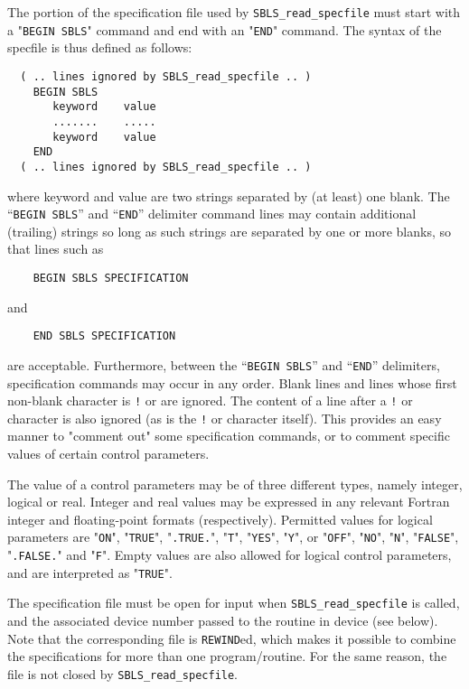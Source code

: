 \documentclass{galahad}
\newcommand{\packagename}{SBLS}
\begin{document}
The portion of the specification file used by
{\tt \packagename\_read\_specfile}
must start
with a "{\tt BEGIN \packagename}" command and end with an
"{\tt END}" command.  The syntax of the specfile is thus defined as follows:
\begin{verbatim}
  ( .. lines ignored by SBLS_read_specfile .. )
    BEGIN SBLS
       keyword    value
       .......    .....
       keyword    value
    END
  ( .. lines ignored by SBLS_read_specfile .. )
\end{verbatim}
where keyword and value are two strings separated by (at least) one blank.
The ``{\tt BEGIN \packagename}'' and ``{\tt END}'' delimiter command lines
may contain additional (trailing) strings so long as such strings are
separated by one or more blanks, so that lines such as
\begin{verbatim}
    BEGIN SBLS SPECIFICATION
\end{verbatim}
and
\begin{verbatim}
    END SBLS SPECIFICATION
\end{verbatim}
are acceptable. Furthermore,
between the
``{\tt BEGIN \packagename}'' and ``{\tt END}'' delimiters,
specification commands may occur in any order.  Blank lines and
lines whose first non-blank character is {\tt !} or {\tt *} are ignored.
The content
of a line after a {\tt !} or {\tt *} character is also
ignored (as is the {\tt !} or {\tt *}
character itself). This provides an easy manner to "comment out" some
specification commands, or to comment specific values
of certain control parameters.

The value of a control parameters may be of three different types, namely
integer, logical or real.
Integer and real values may be expressed in any relevant Fortran integer and
floating-point formats (respectively). Permitted values for logical
parameters are "{\tt ON}", "{\tt TRUE}", "{\tt .TRUE.}", "{\tt T}",
"{\tt YES}", "{\tt Y}", or "{\tt OFF}", "{\tt NO}",
"{\tt N}", "{\tt FALSE}", "{\tt .FALSE.}" and "{\tt F}".
Empty values are also allowed for
logical control parameters, and are interpreted as "{\tt TRUE}".

The specification file must be open for
input when {\tt \packagename\_read\_specfile}
is called, and the associated device number
passed to the routine in device (see below).
Note that the corresponding
file is {\tt REWIND}ed, which makes it possible to combine the specifications
for more than one program/routine.  For the same reason, the file is not
closed by {\tt \packagename\_read\_specfile}.
\end{document}
